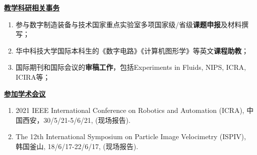 \documentclass[a4paper,fontsize=11pt]{scrartcl} %
\newcommand{\stitle}[1]{
	\noindent\underline{\textbf{#1}} \normalsize\par}
\begin{document}
\stitle{教学科研相关事务}
\begin{enumerate}
	\setlength\itemsep{0.0cm}
	\item 参与数字制造装备与技术国家重点实验室多项国家级/省级\textbf{课题申报}及材料撰写；
	\item 华中科技大学国际本科生的《数字电路》《计算机图形学》等英文\textbf{课程助教}；
	\item 国际期刊和国际会议的\textbf{审稿工作}，包括Experiments in Fluids, NIPS, ICRA, ICIRA等；
\end{enumerate}


\stitle{参加学术会议}
\begin{enumerate}
	\setlength\itemsep{0.0cm}
	\item 2021 IEEE International Conference on Robotics and Automation (ICRA), 中国西安，30/5/21-5/6/21, (现场报告).
	\item The 12th International Symposium on Particle Image Velocimetry (ISPIV), 韩国釜山, 18/6/17-22/6/17, (现场报告).	
\end{enumerate}




\end{document}

